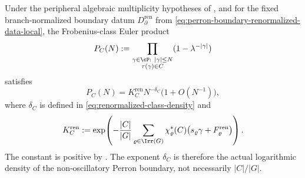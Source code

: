 \begin{proposition}
  \label{prop:renormalized-frobenius-product-component}
  Under the peripheral algebraic multiplicity hypotheses of
  ,
  and for the fixed branch-normalized boundary datum
  \(D_{\partial}^{\mathrm{ren}}\) from
  \eqref{eq:perron-boundary-renormalized-data-local},
  the Frobenius-class Euler product
  \[
    P_C(N):=
    \prod_{\substack{\gamma\in\cP:\ |\gamma|\le N\\
      \tau(\gamma)\in C}}
      (1-\lambda^{-|\gamma|})
  \]
  satisfies
  \begin{equation}\label{eq:renormalized-frobenius-product-component}
    P_C(N)=K_C^{\mathrm{ren}}N^{-\delta_C}\bigl(1+O(N^{-1})\bigr),
  \end{equation}
  where \(\delta_C\) is defined in
  \eqref{eq:renormalized-class-density} and
  \begin{equation}\label{eq:renormalized-frobenius-product-constant-component}
    K_C^{\mathrm{ren}}
    :=
    \exp\!\left(
      -\frac{|C|}{|G|}
        \sum_{\varrho\in\Irr(G)}
          \chi_\varrho^\ast(C)
          \bigl(s_\varrho\gamma+F_\varrho^{\mathrm{ren}}\bigr)
    \right).
  \end{equation}
  The constant is positive by
  .
  The exponent \(\delta_C\) is therefore the actual logarithmic density of
  the non-oscillatory Perron boundary, not necessarily \(|C|/|G|\).
\end{proposition}

